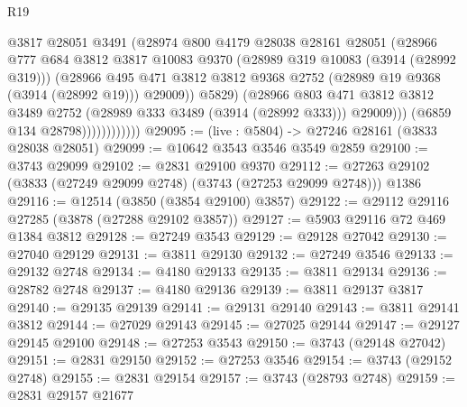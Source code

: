 \begin{lexlean}{R19}
\begin{coremodule}
                              @3817
                              @28051
                              @3491
                              (@28974
                                @800
                                @4179
                                @28038
                                @28161
                                @28051
                                (@28966
                                  @777
                                  @684
                                  @3812
                                  @3817
                                  @10083
                                  @9370
                                  (@28989 @319 @10083 (@3914 (@28992 @319)))
                                  (@28966
                                    @495
                                    @471
                                    @3812
                                    @3812
                                    @9368
                                    @2752
                                    (@28989 @19 @9368 (@3914 (@28992 @19)))
                                    @29009))
                                @5829)
                              (@28966
                                @803
                                @471
                                @3812
                                @3812
                                @3489
                                @2752
                                (@28989 @333 @3489 (@3914 (@28992 @333)))
                                @29009)))
                          (@6859 @134 @28798))))))))))))
@29095 := (live : @5804) -> @27246 @28161 (@3833 @28038 @28051)
@29099 := @10642 @3543 @3546 @3549 @2859
@29100 := @3743 @29099
@29102 := @2831 @29100 @9370
@29112 := @27263 @29102 (@3833 (@27249 @29099 @2748) (@3743 (@27253 @29099 @2748))) @1386
@29116 := @12514 (@3850 (@3854 @29100) @3857)
@29122 := @29112 @29116 @27285 (@3878 (@27288 @29102 @3857))
@29127 := @5903 @29116 @72 @469 @1384 @3812
@29128 := @27249 @3543
@29129 := @29128 @27042
@29130 := @27040 @29129
@29131 := @3811 @29130
@29132 := @27249 @3546
@29133 := @29132 @2748
@29134 := @4180 @29133
@29135 := @3811 @29134
@29136 := @28782 @2748
@29137 := @4180 @29136
@29139 := @3811 @29137 @3817
@29140 := @29135 @29139
@29141 := @29131 @29140
@29143 := @3811 @29141 @3812
@29144 := @27029 @29143
@29145 := @27025 @29144
@29147 := @29127 @29145 @29100
@29148 := @27253 @3543
@29150 := @3743 (@29148 @27042)
@29151 := @2831 @29150
@29152 := @27253 @3546
@29154 := @3743 (@29152 @2748)
@29155 := @2831 @29154
@29157 := @3743 (@28793 @2748)
@29159 := @2831 @29157 @21677

\end{coremodule}
\end{lexlean}

